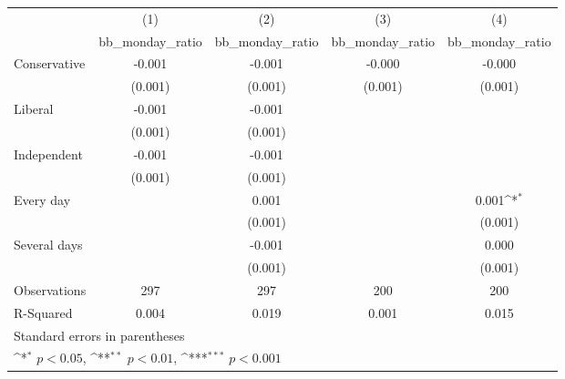 {
\def\sym#1{\ifmmode^{#1}\else\(^{#1}\)\fi}
\begin{tabular}{l*{4}{c}}
\hline\hline
                    &\multicolumn{1}{c}{(1)}&\multicolumn{1}{c}{(2)}&\multicolumn{1}{c}{(3)}&\multicolumn{1}{c}{(4)}\\
                    &\multicolumn{1}{c}{bb\_monday\_ratio}&\multicolumn{1}{c}{bb\_monday\_ratio}&\multicolumn{1}{c}{bb\_monday\_ratio}&\multicolumn{1}{c}{bb\_monday\_ratio}\\
\hline
Conservative        &      -0.001         &      -0.001         &      -0.000         &      -0.000         \\
                    &     (0.001)         &     (0.001)         &     (0.001)         &     (0.001)         \\
[1em]
Liberal             &      -0.001         &      -0.001         &                     &                     \\
                    &     (0.001)         &     (0.001)         &                     &                     \\
[1em]
Independent         &      -0.001         &      -0.001         &                     &                     \\
                    &     (0.001)         &     (0.001)         &                     &                     \\
[1em]
Every day           &                     &       0.001         &                     &       0.001\sym{*}  \\
                    &                     &     (0.001)         &                     &     (0.001)         \\
[1em]
Several days        &                     &      -0.001         &                     &       0.000         \\
                    &                     &     (0.001)         &                     &     (0.001)         \\
\hline
Observations        &         297         &         297         &         200         &         200         \\
R-Squared           &       0.004         &       0.019         &       0.001         &       0.015         \\
\hline\hline
\multicolumn{5}{l}{\footnotesize Standard errors in parentheses}\\
\multicolumn{5}{l}{\footnotesize \sym{*} \(p<0.05\), \sym{**} \(p<0.01\), \sym{***} \(p<0.001\)}\\
\end{tabular}
}
